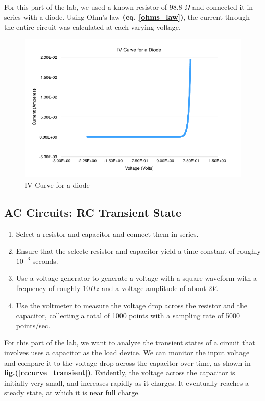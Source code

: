 \documentclass{article}
\begin{document}
For this part of the lab, we used a known resistor of 98.8 $\Omega$ and
connected it in series with a diode. Using Ohm's law \textbf{(eq.
\ref{ohms_law})}, the current through the entire circuit was calculated at each
varying voltage.

\begin{figure}[H]
    \centering
    \includegraphics[width=\textwidth]{charts/ivcurve_diode}
    \caption{IV Curve for a diode}
    \label{ivcurve_diode}
\end{figure}

\subsection{AC Circuits: RC Transient State}

\begin{enumerate}
    \item Select a resistor and capacitor and connect them in series.
    \item Ensure that the selecte resistor and capacitor yield a time constant
    of roughly $10^{-3}$ seconds.
    \item Use a voltage generator to generate a voltage with a square waveform
    with a frequency of roughly $10 Hz$ and a voltage amplitude of about $2 V$.
    \item Use the voltmeter to measure the voltage drop across the resistor and
    the capacitor, collecting a total of 1000 points with a sampling rate of
    5000 points/sec.
\end{enumerate}

For this part of the lab, we want to analyze the transient states of a circuit
that involves uses a capacitor as the load device. We can monitor the input
voltage and compare it to the voltage drop across the capacitor over time, as
shown in \textbf{fig.(\ref{rccurve_transient})}. Evidently, the voltage across
the capacitor is initially very small, and increases rapidly as it charges. It
eventually reaches a steady state, at which it is near full charge.
\end{document}
